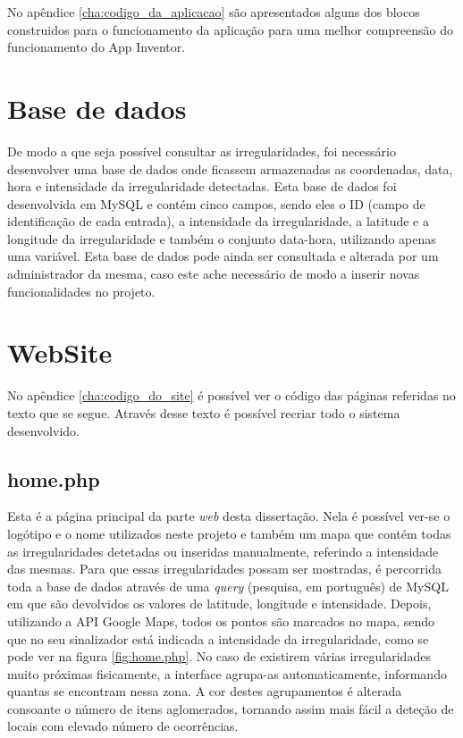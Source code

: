 No apêndice \ref{cha:codigo_da_aplicacao} são apresentados alguns dos blocos construidos para o funcionamento da aplicação para uma melhor compreensão do funcionamento do App Inventor.
\newpage

\section{Base de dados}
\label{sec:Base_de_dados}

De modo a que seja possível consultar as irregularidades, foi necessário desenvolver uma base de dados onde ficassem armazenadas as coordenadas, data, hora e intensidade da irregularidade detectadas.
Esta base de dados foi desenvolvida em MySQL e contém cinco campos, sendo eles o ID (campo de identificação de cada entrada), a intensidade da irregularidade, a latitude e a longitude da irregularidade e também o conjunto data-hora, utilizando apenas uma variável.
Esta base de dados pode ainda ser consultada e alterada por um administrador da mesma, caso este ache necessário de modo a inserir novas funcionalidades no projeto.

\section{WebSite}
\label{sec:website}

No apêndice \ref{cha:codigo_do_site} é possível ver o código das páginas referidas no texto que se segue.
Através desse texto é possível recriar todo o sistema desenvolvido.

\subsection{home.php}
\label{sub:home.php}

Esta é a página principal da parte \emph{web} desta dissertação.
Nela é possível ver-se o logótipo e o nome utilizados neste projeto e também um mapa que contém todas as irregularidades detetadas ou inseridas manualmente, referindo a intensidade das mesmas.
Para que essas irregularidades possam ser mostradas, é percorrida toda a base de dados através de uma \emph{query} (pesquisa, em português) de MySQL em que são devolvidos os valores de latitude, longitude e intensidade.
Depois, utilizando a API Google Maps, todos os pontos são marcados no mapa, sendo que no seu sinalizador está indicada a intensidade da irregularidade, como se pode ver na figura \ref{fig:home.php}.
No caso de existirem várias irregularidades muito próximas fisicamente, a interface agrupa-as automaticamente, informando quantas se encontram nessa zona.
A cor destes agrupamentos é alterada consoante o número de itens aglomerados, tornando assim mais fácil a deteção de locais com elevado número de ocorrências.

